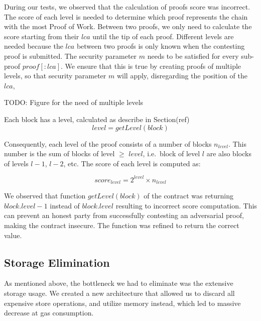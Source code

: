 During our tests, we observed that the calculation of proofs score was
incorrect. The score of each level is needed to determine which proof
represents the chain with the most Proof of Work. Between two proofs, we only
need to calculate the score starting from their $lca$ until the tip of each
proof. Different levels are needed because the $lca$ between two proofs is only
known when the contesting proof is submitted. The security parameter $m$ needs
to be satisfied for every sub-proof $proof[:lca]$. We ensure that this is true
by creating proofs of multiple levels, so that security parameter $m$ will
apply, disregarding the position of the $lca$,

TODO: Figure for the need of multiple levels

Each block has a level, calculated as describe in Section(ref)
\[ level = getLevel(block) \]

Consequently, each level of the proof consists of a number of blocks
$n_{level}$. This number is the sum of blocks of level $\geq$ $level$, i.e.\
block of level $l$ are also blocks of levels $l-1$, $l-2$, etc. The
score of each level is computed as:

\[score_{level} = 2^{level} \times n_{level}\]

We observed that function $getLevel(block)$ of the contract was returning
$block.level-1$ instead of $block.level$ resulting to incorrect score
computation. This can prevent an honest party from successfully contesting an
adversarial proof, making the contract insecure. The function was refined to
return the correct value.

\subsection{Storage Elimination}

As mentioned above, the bottleneck we had to eliminate was the extensive
storage usage. We created a new architecture that allowed us to discard all
expensive store operations, and utilize memory instead, which led to massive
decrease at gas consumption.

